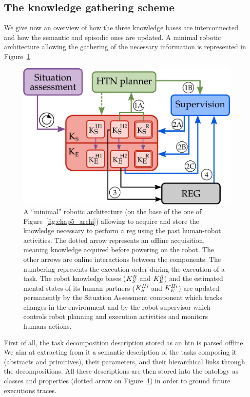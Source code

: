 \subsection{The knowledge gathering scheme}

We give now an overview of how the three knowledge bases are interconnected and how the semantic and episodic ones are updated. A minimal robotic architecture allowing the gathering of the necessary information is represented in Figure~\ref{fig:chap6_architecture}.

\newpage

\begin{figure}[ht!]
\centering
\includegraphics[scale=0.37]{figures/chapter6/architecture.png}
\caption{\label{fig:chap6_architecture} A ``minimal'' robotic architecture (on the base of the one of Figure~\ref{fig:chap5_archi}) allowing to acquire and store the knowledge necessary to perform a \acrshort{reg} using the past human-robot activities. The dotted arrow represents an offline acquisition, meaning knowledge acquired before powering on the robot. The other arrows are online interactions between the components. The numbering represents the execution order during the execution of a task.
The robot knowledge bases ($K_S^{R}$ and $K_E^{R}$) and the estimated mental states of its human partners ($K_S^{Hi}$ and $K_E^{Hi}$) are updated permanently by the Situation Assessment component which tracks changes in the environment and by the robot supervisor which controls robot planning and execution activities and monitors humans actions.}
\end{figure}

First of all, the task decomposition description stored as an \acrshort{htn} is parsed offline. We aim at extracting from it a semantic description of the tasks composing it (abstracts and primitives), their parameters, and their hierarchical links through the decompositions. All these descriptions are then stored into the ontology as classes and properties (dotted arrow on Figure~\ref{fig:chap6_architecture}) in order to ground future executions traces.

